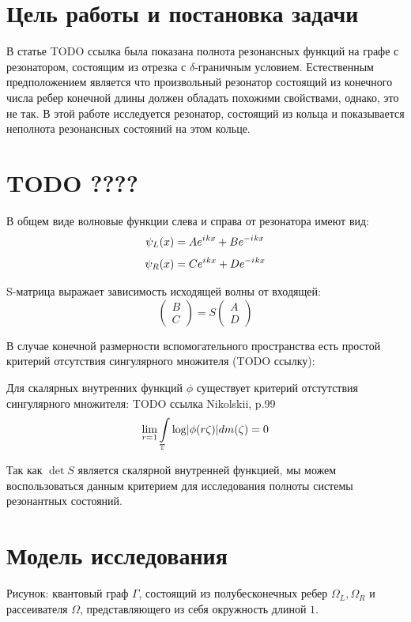 \documentclass{nsart_eng}
\DeclarePairedDelimiter{\abs}{\lvert}{\rvert}
\newcommand{\eexp}[1]{e^{#1}}
\newcommand{\iu}{{i\mkern1mu}}
\begin{document}
\section{Цель работы и постановка задачи}
В статье TODO ссылка была показана полнота резонансных функций на графе с резонатором, состоящим из отрезка с $\delta$-граничным условием. Естественным предположением является что произвольный резонатор состоящий из конечного числа ребер конечной длины должен обладать похожими свойствами, однако, это не так. В этой работе исследуется резонатор, состоящий из кольца и показывается неполнота резонансных состояний на этом кольце.

\section{TODO ???? }
В общем виде волновые функции слева и справа от резонатора имеют вид:
\[
\psi_L(x) = A \eexp{\iu k x} + B \eexp{-\iu k x}
\]
\[
\psi_R(x) = C \eexp{\iu k x} + D \eexp{-\iu k x}
\]

S-матрица выражает зависимость исходящей волны от входящей:
\[
\begin{pmatrix} B \\ C \end{pmatrix} = S \begin{pmatrix} A \\ D \end{pmatrix}
\]

В случае конечной размерности вспомогательного пространства есть простой критерий отсутствия сингулярного множителя (TODO ссылку):

Для скалярных внутренних функций $\phi$ существует критерий отстутствия сингулярного множителя: TODO ссылка Nikolskii, p.99
\[
\lim\limits_{r = 1} \int\limits_{\bbT} \log \abs{\phi(r \zeta)} d m(\zeta) = 0
\]

Так как $\det S$ является скалярной внутренней функцией, мы можем воспользоваться данным критерием для исследования полноты системы резонантных состояний.


\section{Модель исследования}
Рисунок: квантовый граф $\Gamma$, состоящий из полубесконечных ребер $\Omega_L, \Omega_R$ и рассеивателя $\Omega$, представляющего из себя окружность длиной $1$.
\end{document}
